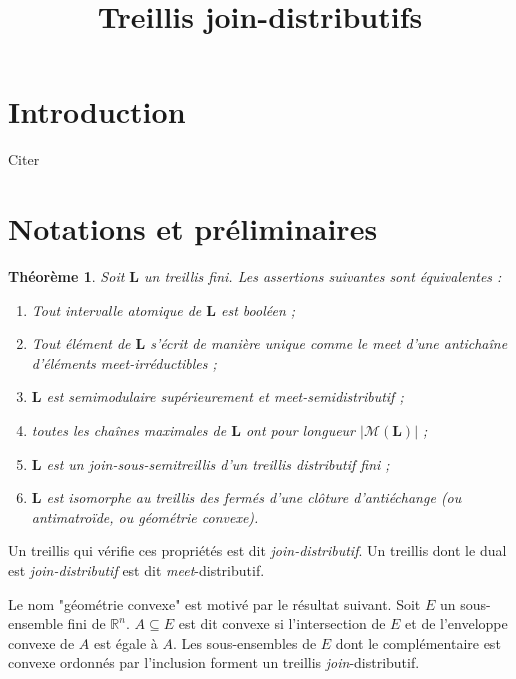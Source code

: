 \documentclass[leqno, 12pt]{amsart}
\title{Treillis join-distributifs}
\newcommand{\darkblue}{\color{darkblue}} %
\newcommand{\defn}[1]{\textsl{\darkblue #1}} %
\numberwithin{equation}{section}
\newtheorem{thm}{Théorème}[section]
\renewcommand{\L}{\mathbf L}
\newcommand{\R}{\mathbb{R}}
\newcommand{\MIrr}{\mathcal M}
\begin{document}
\maketitle

\tableofcontents

\section{Introduction}

Citer \cite{AFN22} \cite{Czed14} \cite{Arm09}

\section{Notations et préliminaires}


\begin{thm}
   Soit $\L$ un treillis fini. Les assertions suivantes sont équivalentes :
   \begin{enumerate}
   \item \label{item:1} Tout intervalle atomique de $\L$ est booléen ;
   \item \label{item:2} Tout élément de $\L$ s'écrit de manière unique comme le \emph{meet} d'une antichaîne d'éléments \emph{meet}-irréductibles ;
   \item \label{item:3} $\L$ est semimodulaire supérieurement et \emph{meet}-semidistributif ;
   \item \label{item:4} toutes les chaînes maximales de $\L$ ont pour longueur $|\MIrr(\L)|$ ;
   \item \label{item:5} $\L$ est un \emph{join}-sous-semitreillis d'un treillis distributif fini ;
   \item \label{item:6} $\L$ est isomorphe au treillis des fermés d'une clôture d'antiéchange (ou antimatroïde, ou géométrie convexe).
   \end{enumerate}
\end{thm}

Un treillis qui vérifie ces propriétés est dit \defn{\emph{join}-distributif}. Un treillis dont le dual est \defn{\emph{join}-distributif }est dit \emph{meet}-distributif.

Le nom "géométrie convexe" est motivé par le résultat suivant. Soit $E$ un sous-ensemble fini de $\R^n$. $A\subseteq E$ est dit convexe si l'intersection de $E$ et de l'enveloppe convexe de $A$ est égale à $A$. Les sous-ensembles de $E$ dont le complémentaire est convexe ordonnés par l'inclusion forment un treillis \emph{join}-distributif.
\end{document}
